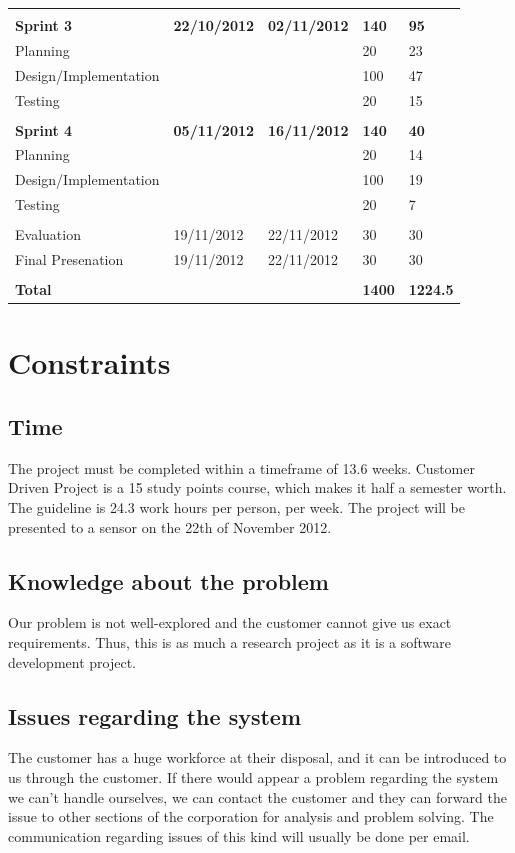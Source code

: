\begin{table}
\begin{tabular}{ l l l l l }
\hline \\ [-2.0ex]
 \bf{Sprint 3}			&\bf{22/10/2012}	&\bf{02/11/2012}	&\bf{140}		&\bf{95}		\\
 Planning				&				&				&20			&23		\\
 Design/Implementation	&				&				&100		&47		\\
 Testing				&				&				&20			&15		\\
\hline \\ [-2.0ex]
 \bf{Sprint 4}			&\bf{05/11/2012}	&\bf{16/11/2012}	&\bf{140}		&\bf{40}		\\
 Planning				&				&				&20			&14		\\
 Design/Implementation	&				&				&100		&19		\\
 Testing				&				&				&20			&7		\\
\hline \\ [-2.0ex]
 Evaluation			&19/11/2012		&22/11/2012		&30			&30		\\
 Final Presenation		&19/11/2012		&22/11/2012		&30			&30		\\
\hline \\ [-2.0ex]
 \bf{Total}			&				&				&\bf{1400}	&\bf{1224.5}		\\
\hline
\end{tabular}
\label{table:wbs}
\end{table}


\section{Constraints}
\subsection{Time}
The project must be completed within a timeframe of 13.6 weeks. Customer Driven Project is a 15 study points course, which makes it half a semester worth. The guideline is 24.3 work hours per person, per week. The project will be presented to a sensor on the 22th of November 2012.

\subsection{Knowledge about the problem}
Our problem is not well-explored and the customer cannot give us exact requirements. Thus, this is as much a research project as it is a software development project.

\subsection{Issues regarding  the system}
The customer has a huge workforce at their disposal, and it can be introduced to us through the customer. If there would appear a problem regarding the system we can’t handle ourselves, we can contact the customer and they can forward the issue to other sections of the corporation for analysis and problem solving. The communication regarding issues of this kind will usually be done per email. 

